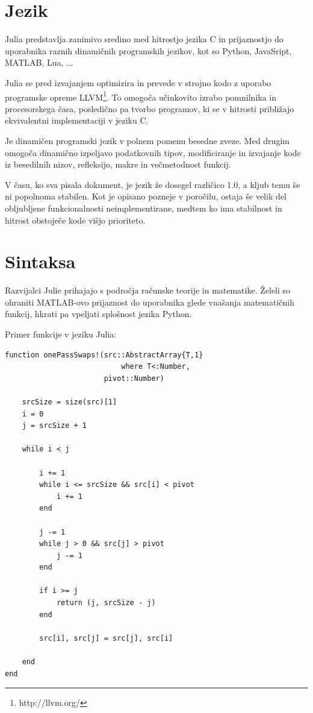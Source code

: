 \documentclass[journal,a4paper,twoside]{sty/IEEEtran}
\begin{document}
\section{Jezik}

Julia predstavlja zanimivo sredino med hitrostjo jezika C in prijaznostjo do uporabnika raznih dinamičnih programskih jezikov, kot so Python, JavaSript,
	MATLAB, Lua, ...

Julia se pred izvajanjem optimizira in prevede v strojno kodo z uporabo programske opreme LLVM\footnote{http://llvm.org/}.
To omogoča učinkovito izrabo pomnilnika in procesorskega časa, posledično pa tvorbo programov, ki se v hitrosti približajo ekvivalentni implementaciji v
	jeziku C.\cite{julia-benchmarks}

Je dinamičen programski jezik v polnem pomenu besedne zveze.
Med drugim omogoča dinamično izpeljavo podatkovnih tipov, modificiranje in izvajanje kode iz besedilnih nizov,\cite{julia-metaprogramming} refleksijo,
	makre in večmetodnost funkcij.

V času, ko sva pisala dokument, je jezik že dosegel različico 1.0, a kljub temu še ni popolnoma stabilen.
Kot je opisano pozneje v poročilu, ostaja še velik del obljubljene funkcionalnosti neimplementirane, medtem ko ima stabilnost in hitrost obstoječe kode
	višjo prioriteto.

\section{Sintaksa}

Razvijalci Julie prihajajo s področja računske teorije in matematike\cite{julia-reasons}.
Želeli so ohraniti MATLAB-ovo prijaznost do uporabnika glede vnašanja matematičnih funkcij, hkrati pa vpeljati splošnost jezika Python.

Primer funkcije v jeziku Julia:
\begin{lstlisting}
function onePassSwaps!(src::AbstractArray{T,1}
                           where T<:Number,
                       pivot::Number)
    
    srcSize = size(src)[1]
    i = 0
    j = srcSize + 1
    
    while i < j
    
        i += 1
        while i <= srcSize && src[i] < pivot
            i += 1
        end
        
        j -= 1
        while j > 0 && src[j] > pivot
            j -= 1
        end
        
        if i >= j
            return (j, srcSize - j)
        end
        
        src[i], src[j] = src[j], src[i]
        
    end
end
\end{lstlisting}
\end{document}
